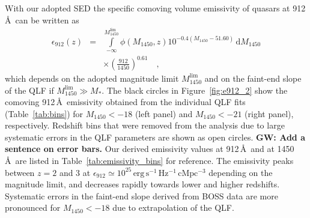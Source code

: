 \documentclass[fleqn,usenatbib]{mnras}
\begin{document}
With our adopted SED the specific comoving volume emissivity of quasars at 912\,\AA\ can be written as
\begin{eqnarray}\nonumber
\epsilon_{912}\left(z\right)&=&\int\limits_{-\infty}^{M_{1450}^\mathrm{lim}}\phi\left(M_{1450},z\right)10^{-0.4\left(M_{1450}-51.60\right)}\,\mathrm{d}M_{1450}\\
& &\times\left(\frac{912}{1450}\right)^{0.61}\quad,
\label{eqn:epsilon}
\end{eqnarray}
which depends on the adopted magnitude limit $M_{1450}^\mathrm{lim}$ and on the
faint-end slope of the QLF if $M_{1450}^\mathrm{lim}\gg M_*$.
The black circles in Figure~\ref{fig:e912_2} show the comoving 912\,\AA\ emissivity
obtained from the individual QLF fits (Table~\ref{tab:bins}) for $M_{1450}<-18$ (left panel)
and $M_{1450}<-21$ (right panel), respectively. Redshift bins that were removed from
the analysis due to large systematic errors in the QLF parameters are shown as open circles.
\textbf{GW: Add a sentence on error bars.}
Our derived emissivity values at 912\,\AA\ and at 1450\,\AA\ are listed in Table~\ref{tab:emissivity_bins}
for reference.
The emissivity peaks between $z=2$ and 3 at $\epsilon_{912}\simeq 10^{25}\,\mathrm{erg\, s^{-1}\, Hz^{-1}\, cMpc^{-3}}$
depending on the magnitude limit, and decreases rapidly towards lower and higher redshifts.
Systematic errors in the faint-end slope derived from BOSS data are
more pronounced for $M_{1450}<-18$ due to extrapolation of the QLF. 
\end{document}
